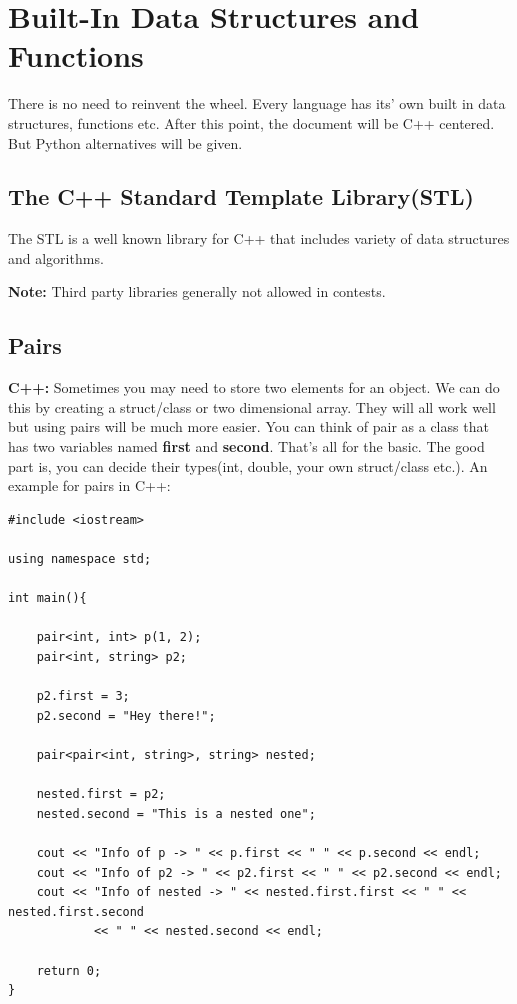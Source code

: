 \documentclass[12pt]{article}
\begin{document}
\section{Built-In Data Structures and Functions}

There is no need to reinvent the wheel. Every language has its' own built in data structures, functions etc. After this point, the document will be C++ centered. But Python alternatives will be given.

\subsection{The C++ Standard Template Library(STL)}
The STL is a well known library for C++ that includes variety of data structures and algorithms.

\textbf{Note:} Third party libraries generally not allowed in contests.

\subsection{Pairs}

\textbf{C++:} Sometimes you may need to store two elements for an object. We can do this by creating a struct/class or two dimensional array. They will all work well but using pairs will be much more easier. You can think of pair as a class that has two variables named \textbf{first} and \textbf{second}. That's all for the basic. The good part is, you can decide their types(int, double, your own struct/class etc.). An example for pairs in C++:

\begin{verbatim}
#include <iostream>

using namespace std;

int main(){

    pair<int, int> p(1, 2);
    pair<int, string> p2;

    p2.first = 3;
    p2.second = "Hey there!";

    pair<pair<int, string>, string> nested;
    
    nested.first = p2;
    nested.second = "This is a nested one";

    cout << "Info of p -> " << p.first << " " << p.second << endl;
    cout << "Info of p2 -> " << p2.first << " " << p2.second << endl;
    cout << "Info of nested -> " << nested.first.first << " " << nested.first.second
            << " " << nested.second << endl;

    return 0;
}
\end{verbatim}
\cleardoublepage
\end{document}
